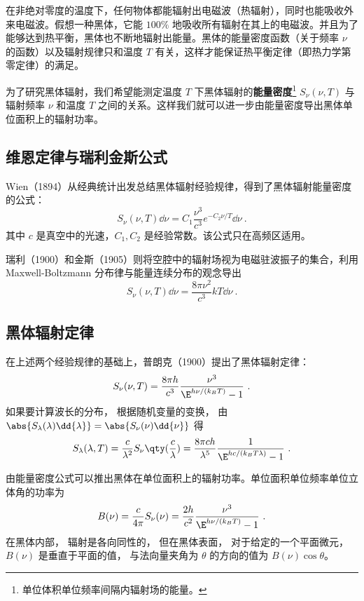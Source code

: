 
在非绝对零度的温度下，任何物体都能辐射出电磁波（热辐射），同时也能吸收外来电磁波。假想一种黑体，它能 $100\%$ 地吸收所有辐射在其上的电磁波。并且为了能够达到热平衡，黑体也不断地辐射出能量。黑体的能量密度函数（关于频率 $\nu$ 的函数）以及辐射规律只和温度 $T$ 有关，这样才能保证热平衡定律（即热力学第零定律）的满足。

为了研究黑体辐射，我们希望能测定温度 $T$ 下黑体辐射的\textbf{能量密度}\footnote{单位体积单位频率间隔内辐射场的能量。} $S_\nu(\nu,T)$ 与辐射频率 $\nu$ 和温度 $T$ 之间的关系。这样我们就可以进一步由能量密度导出黑体单位面积上的辐射功率。

\subsection{维恩定律与瑞利金斯公式}
Wien（1894）从经典统计出发总结黑体辐射经验规律，得到了黑体辐射能量密度的公式：
\begin{equation}
S_\nu(\nu,T)\dd \nu=C_1 \frac{\nu^3}{c^3}e^{-C_2\nu/T}\dd \nu~.
\end{equation}
其中 $c$ 是真空中的光速，$C_1,C_2$ 是经验常数。该公式只在高频区适用。

瑞利（1900）和金斯（1905）则将空腔中的辐射场视为电磁驻波振子的集合，利用 Maxwell-Boltzmann 分布律与能量连续分布的观念导出
\begin{equation}
S_\nu(\nu,T)\dd \nu=\frac{8\pi\nu^2}{c^3}kT\dd \nu~.
\end{equation}


\subsection{黑体辐射定律}
在上述两个经验规律的基础上，普朗克（1900）提出了黑体辐射定律：
\begin{equation}
S_\nu(\nu,T) = \frac{8\pi h}{c^3}\frac{\nu^3}{\E^{h\nu/(k_B T)} - 1}~.
\end{equation}
如果要计算波长的分布， 根据随机变量的变换， 由 $\abs{S_\lambda(\lambda) \dd{\lambda}} = \abs{S_\nu(\nu)\dd{\nu}}$ 得
\begin{equation}\label{eq_BBdLaw_1}
S_\lambda(\lambda,T) = \frac{c}{\lambda^2}S_\nu\qty(\frac{c}{\lambda}) =
\frac{8\pi ch}{\lambda^5} \frac{1}{\E^{hc/(k_B T\lambda)} - 1}~.
\end{equation}

由能量密度公式可以推出黑体在单位面积上的辐射功率。单位面积单位频率单位立体角的功率为
\begin{equation}\label{eq_BBdLaw_2}
B(\nu) = \frac{c}{4\pi}S_\nu(\nu) = \frac{2h}{c^2} \frac{\nu^3}{\E^{h\nu/(k_B T)} - 1}~.
\end{equation}
在黑体内部， 辐射是各向同性的， 但在黑体表面， 对于给定的一个平面微元， $B(\nu)$ 是垂直于平面的值， 与法向量夹角为 $\theta$ 的方向的值为 $B(\nu)\cos\theta$。

